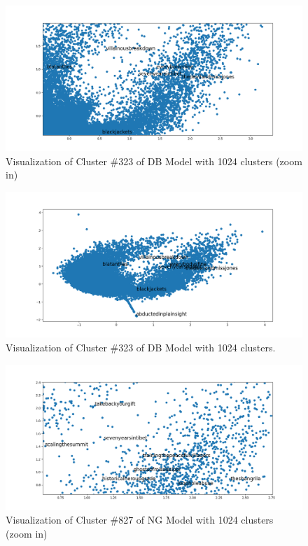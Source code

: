\documentclass[letterpaper]{article}
\begin{document}
	\begin{figure}
	\centering
	\includegraphics[width=1\linewidth]{../images/cluster-db-1024-c323-zoom-in.png}
	\caption{Visualization of Cluster \#323 of DB Model with 1024 clusters (zoom in)}
	\label{fig:cluster-db-323-visualization-zoom-in}
	\end{figure}
	
	
	\begin{figure}
	\centering
	\includegraphics[width=1\linewidth]{../images/cluster-db-1024-c323-zoom-out.png}
	\caption{Visualization of Cluster \#323 of DB Model with 1024 clusters.}
	\label{fig:cluster-db-323-visualization-zoom-out}
	\end{figure}
	
		\begin{figure}
	\centering
	\includegraphics[width=1\linewidth]{../images/cluster-ng-1024-c827-zoom-in.png}
	\caption{Visualization of Cluster \#827 of NG Model with 1024 clusters (zoom in)}
	\label{fig:cluster-ng-827-visualization-zoom-in}
	\end{figure}
	
\end{document}
